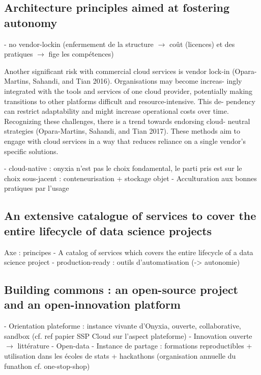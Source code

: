 \subsection{Architecture principles aimed at fostering autonomy}

- no vendor-lockin (enfermement de la structure $\rightarrow$ coût (licences) et des pratiques $\rightarrow$ fige les compétences)

Another significant risk with commercial cloud services is vendor lock-in
(Opara-Martins, Sahandi, and Tian 2016). Organisations may become increas-
ingly integrated with the tools and services of one cloud provider, potentially
making transitions to other platforms difficult and resource-intensive. This de-
pendency can restrict adaptability and might increase operational costs over
time. Recognizing these challenges, there is a trend towards endorsing cloud-
neutral strategies (Opara-Martins, Sahandi, and Tian 2017). These methods
aim to engage with cloud services in a way that reduces reliance on a single
vendor’s specific solutions.

- cloud-native : onyxia n'est pas le choix fondamental, le parti pris est sur le choix sous-jacent : conteneurisation + stockage objet
- Acculturation aux bonnes pratiques par l'usage

\subsection{An extensive catalogue of services to cover the entire lifecycle of data science projects}

Axe : principes
- A catalog of services which covers the entire lifecycle of a data science project
- production-ready : outils d'automatisation (-> autonomie)

\subsection{Building commons : an open-source project and an open-innovation platform}

- Orientation plateforme : instance vivante d'Onyxia, ouverte, collaborative, sandbox (cf. ref papier SSP Cloud sur l'aspect plateforme)
- Innovation ouverte $\rightarrow$ littérature
- Open-data
- Instance de partage : formations reproductibles + utilisation dans les écoles de stats + hackathons (organisation annuelle du funathon cf. one-stop-shop)
